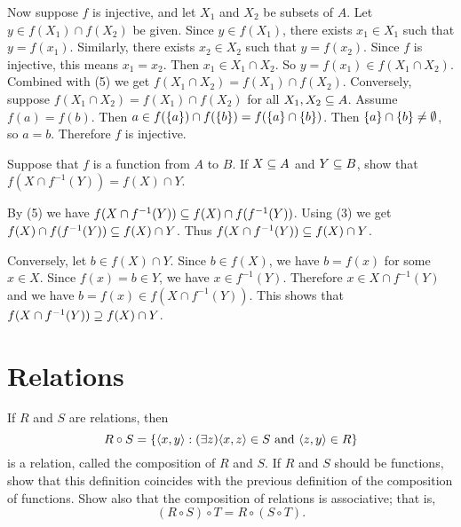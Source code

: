 \begin{solution}
Now suppose $f$ is injective, and let $X_1$ and $X_2$ be subsets of $A$.
Let $y\in f(X_1)\cap f(X_2)$ be given.
Since $y\in f(X_1)$, there exists $x_1\in X_1$ such that $y=f(x_1)$.
Similarly, there exists $x_2\in X_2$ such that $y=f(x_2)$.
Since $f$ is injective, this means $x_1=x_2$. Then $x_1\in X_1\cap X_2$.
So $y=f(x_1)\in f(X_1\cap X_2)$. Combined with (5) we get $f(X_1\cap X_2)= f(X_1)\cap f(X_2)$.
Conversely, suppose $f(X_1\cap X_2)= f(X_1)\cap f(X_2)$ for all $X_1,X_2\subseteq A$.
Assume $f(a)=f(b)$. Then $a\in f(\left\{a\right\})\cap f(\left\{b\right\})=f(\left\{a\right\}\cap\left\{b\right\})$.
Then $\left\{a\right\}\cap\left\{b\right\}\neq\emptyset$, so $a=b$. Therefore $f$ is injective.
\end{solution}

\begin{exercise}
Suppose that $f$ is a function from $A$ to $B$. If $X\subseteq A$ and $Y\subseteq B$, show that
$f(X\cap f^{-1}(Y)) = f(X)\cap Y$.
\end{exercise}

\begin{solution}
By (5) we have $f(X\cap f^{-1}(Y)) \subseteq f(X)\cap f(f^{-1}(Y))$.
Using (3) we get $f(X)\cap f(f^{-1}(Y))\subseteq f(X)\cap Y$.
Thus $f(X\cap f^{-1}(Y)) \subseteq f(X)\cap Y$.

Conversely, let $b\in f(X)\cap Y$. Since $b\in f(X)$, we have $b=f(x)$ for some $x\in X$.
Since $f(x)=b\in Y$, we have $x\in f^{-1}(Y)$. Therefore $x\in X\cap f^{-1}(Y)$ and we have
$b=f(x)\in f(X\cap f^{-1}(Y))$.
This shows that $f(X\cap f^{-1}(Y)) \supseteq f(X)\cap Y$.
\end{solution}

\section{Relations}
\begin{exercise}
If $R$ and $S$ are relations, then
\[R\circ S = \setb{\aprn{x,y}}{(\exists z)\aprn{x,z}\in S\land\aprn{z,y}\in R}\]
is a relation, called the composition of $R$ and $S$. If $R$ and $S$ should be functions, show
that this definition coincides with the previous definition of the composition of functions.
Show also that the composition of relations is associative; that is,
\[(R\circ S)\circ T=R\circ (S\circ T).\]
\end{exercise}

